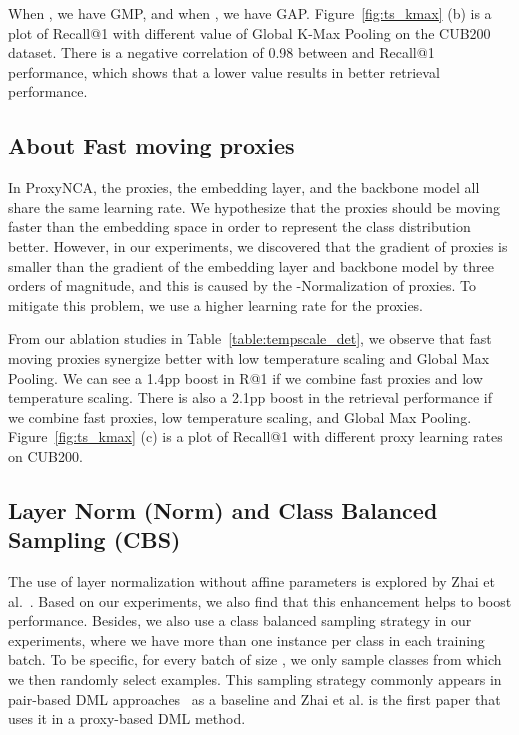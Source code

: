 \documentclass[runningheads]{llncs}
\begin{document}
When , we have GMP, and when , we have GAP. Figure~\ref{fig:ts_kmax} (b) is a plot of Recall@1 with different  value of Global K-Max Pooling on the CUB200 dataset. There is a negative correlation of 0.98 between  and Recall@1 performance, which shows that a lower  value results in better retrieval performance. 


\subsection{About Fast moving proxies}


In ProxyNCA, the proxies, the embedding layer, and the backbone model all share the same learning rate. We hypothesize that the proxies should be moving faster than the embedding space in order to represent the class distribution better. However, in our experiments, we discovered that the gradient of proxies is smaller than the gradient of the embedding layer and backbone model by three orders of magnitude, and this is caused by the  -Normalization of proxies. 
To mitigate this problem, we use a higher learning rate for the proxies. 

From our ablation studies in Table~\ref{table:tempscale_det}, we observe that fast moving proxies synergize better with low temperature scaling and Global Max Pooling. We can see a 1.4pp boost in R@1 if we combine fast proxies and low temperature scaling. There is also a 2.1pp boost in the retrieval performance if we combine fast proxies, low temperature scaling, and Global Max Pooling. Figure~\ref{fig:ts_kmax} (c) is a plot of Recall@1 with different proxy learning rates on CUB200.

\subsection{Layer Norm (Norm) and Class Balanced Sampling (CBS)}
The use of layer normalization \cite{vaswani2017attention} without affine parameters is explored by Zhai et al.~\cite{zhai2019}. Based on our experiments, we also find that this enhancement helps to boost performance. Besides, we also use a class balanced sampling strategy in our experiments, where we have more than one instance per class in each training batch. To be specific, for every batch of size , we only sample  classes from which we then randomly select  examples. This sampling strategy commonly appears in pair-based DML approaches~\cite{wang2019multi,wu2017sampling,song2016deep} as a baseline and
Zhai et al. is the first paper that uses it in a proxy-based DML method.
\end{document}
